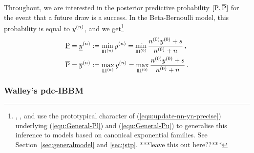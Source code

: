 Throughout, we are interested in the posterior predictive
probability $[\underline{\operatorname{P}},\overline{\operatorname{P}}]$ for the event that a
future draw is a success. In the Beta-Bernoulli model, this
probability is equal to $y^{(n)}$, and we get\footnote{%
\textcite{2005:quaeghebeurcooman}, \textcite{Walter2009a}, and \textcite{Walter2007a} use the prototypical character of
(\ref{equ:update-nn-yn-precise}) underlying (\ref{equ:General-Pl}) and
(\ref{equ:General-Pu}) to generalise this inference to models based on canonical exponential families.
See Section~\ref{sec:generalmodel} and \ref{sec:jstp}. ***leave this out here??***}
%
\begin{align}
\underline{\operatorname{P}} = \underline{y}^{(n)} &:= \min_{\text{I}\!\Pi^{(n)}} y^{(n)} = \min_{\text{I}\!\Pi^{(0)}} \frac{n^{(0)}y^{(0)} + s}{n^{(0)} +n}\,, \label{equ:General-Pl}\\
\overline{\operatorname{P}} = \overline{y}^{(n)} &:= \max_{\text{I}\!\Pi^{(n)}} y^{(n)} = \max_{\text{I}\!\Pi^{(0)}} \frac{n^{(0)}y^{(0)} + s}{n^{(0)} +n}\,. \label{equ:General-Pu}
\end{align}


\subsubsection{Walley's pdc-IBBM}
\label{sec:ibbm-walley}

